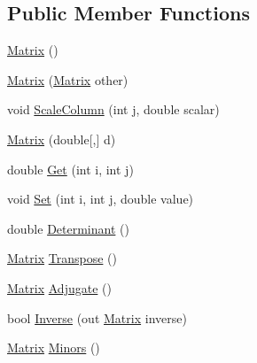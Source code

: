 \subsection*{Public Member Functions}
\begin{DoxyCompactItemize}
\item 
\mbox{\hyperlink{class_eagle_eye_1_1_models_1_1_geometry_1_1_matrix_a81deff683b5e1aad589bd0823054ae15}{Matrix}} ()
\item 
\mbox{\hyperlink{class_eagle_eye_1_1_models_1_1_geometry_1_1_matrix_acc8487d36eee8c9fab685dd843ad9458}{Matrix}} (\mbox{\hyperlink{class_eagle_eye_1_1_models_1_1_geometry_1_1_matrix}{Matrix}} other)
\item 
void \mbox{\hyperlink{class_eagle_eye_1_1_models_1_1_geometry_1_1_matrix_a43304b460f0e9071e9a1fd2f2cda73b8}{Scale\+Column}} (int j, double scalar)
\item 
\mbox{\hyperlink{class_eagle_eye_1_1_models_1_1_geometry_1_1_matrix_a630f94d343773a673557e75c3604ef67}{Matrix}} (double\mbox{[},\mbox{]} d)
\item 
double \mbox{\hyperlink{class_eagle_eye_1_1_models_1_1_geometry_1_1_matrix_a1b13104b3b70f8886591bffea10d87e5}{Get}} (int i, int j)
\item 
void \mbox{\hyperlink{class_eagle_eye_1_1_models_1_1_geometry_1_1_matrix_aeebb46e5118b02be93b0c75df62ff1ef}{Set}} (int i, int j, double value)
\item 
double \mbox{\hyperlink{class_eagle_eye_1_1_models_1_1_geometry_1_1_matrix_a29981530fa3c9397a2b7daf39548647b}{Determinant}} ()
\item 
\mbox{\hyperlink{class_eagle_eye_1_1_models_1_1_geometry_1_1_matrix}{Matrix}} \mbox{\hyperlink{class_eagle_eye_1_1_models_1_1_geometry_1_1_matrix_ac0d40e692ec3157a7fc034a3b01447e5}{Transpose}} ()
\item 
\mbox{\hyperlink{class_eagle_eye_1_1_models_1_1_geometry_1_1_matrix}{Matrix}} \mbox{\hyperlink{class_eagle_eye_1_1_models_1_1_geometry_1_1_matrix_a50a22a69e3975db229558520997b91a2}{Adjugate}} ()
\item 
bool \mbox{\hyperlink{class_eagle_eye_1_1_models_1_1_geometry_1_1_matrix_a6d951dec401cc5239e3fa57dbae720a2}{Inverse}} (out \mbox{\hyperlink{class_eagle_eye_1_1_models_1_1_geometry_1_1_matrix}{Matrix}} inverse)
\item 
\mbox{\hyperlink{class_eagle_eye_1_1_models_1_1_geometry_1_1_matrix}{Matrix}} \mbox{\hyperlink{class_eagle_eye_1_1_models_1_1_geometry_1_1_matrix_a121833737b07b1791264d0f4f10a621b}{Minors}} ()
\end{DoxyCompactItemize}
